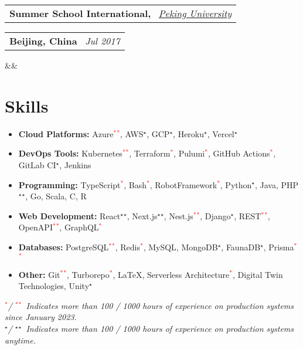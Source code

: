 \documentclass[11pt,a4paper,sans]{moderncv}
\makeatletter
\newcommand*{\customcventry}[7][.13em]{
\begin{tabular}{@{}l}
{\bfseries #4} \
{\itshape #3}
\end{tabular}
\hfill
\begin{tabular}{l@{}}
{\bfseries #5} \
{\itshape #2}
\end{tabular}
\ifx&#7&%
\else{\
\begin{minipage}{\maincolumnwidth}%
\small#7%
\end{minipage}}\fi%
\par\addvspace{#1}}
\newcommand{\inlineLink}[2]{%
    \underline{\href{#1}{#2}}%
}
\makeatother
\begin{document}
\customcventry
    {Jul 2017}
    {\color{blue}\href{http://www.oir.pku.edu.cn/summerschool/}{Peking University}}
    {Summer School International,}
    {Beijing, China}
    {}{}
    {
        \begin{itemize}[leftmargin=0.6cm, label={\textbullet}]
        \end{itemize}
    }

\section{Skills}
{
    \newcommand{\skilled}{\textcolor{black}{$^\star$}}
    \newcommand{\sskilled}{\skilled\skilled}
    \newcommand{\skilledRecent}{\textcolor{red}{$^*$}}
    \newcommand{\sskilledRecent}{\skilledRecent\skilledRecent}

    \begin{itemize}[label=\textbullet]
        \item {\textbf{Cloud Platforms:} Azure\sskilledRecent, AWS\skilled, GCP\skilled, Heroku\skilled, Vercel\skilled}
        \item {\textbf{DevOps Tools:} Kubernetes\sskilledRecent, Terraform\skilledRecent, Pulumi\skilledRecent, GitHub Actions\skilledRecent, GitLab CI\skilled, Jenkins}
        \item {\textbf{Programming:} TypeScript\skilledRecent, Bash\skilledRecent, RobotFramework\skilledRecent, Python\skilled, Java, PHP\sskilled, Go, Scala, C, R}
        \item {\textbf{Web Development:} React\sskilled, Next.js\sskilled, Nest.js\sskilledRecent, Django\skilled, REST\sskilledRecent, OpenAPI\sskilledRecent, GraphQL\skilledRecent}
        \item {\textbf{Databases:} PostgreSQL\sskilledRecent, Redis\skilledRecent, MySQL, MongoDB\skilled, FaunaDB\skilled, Prisma\sskilledRecent}
        \item {\textbf{Other:} Git\sskilledRecent, Turborepo\skilledRecent, LaTeX, Serverless Architecture\skilledRecent, Digital Twin Technologies, Unity\skilled}
    \end{itemize}
%
    {\footnotesize%
        \vspace{-2mm}%
        \emph{%
            \hspace*{4mm}\skilledRecent / \sskilledRecent~Indicates more than 100 / 1000 hours of experience on production systems since January 2023.
        } \\
        \emph{%
            \hspace*{4mm}\skilled / \sskilled~Indicates more than 100 / 1000 hours of experience on production systems anytime.}
        }
        
    }
    
\end{document}
